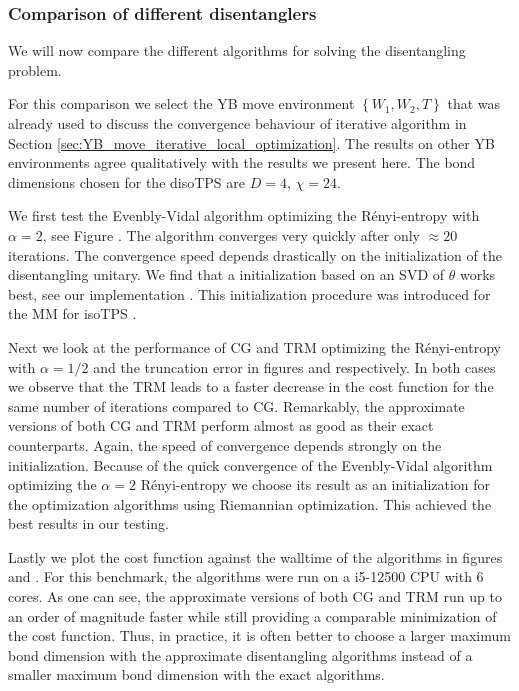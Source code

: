 \subsubsection*{\hspace{105pt}Comparison of different disentanglers}
We will now compare the different algorithms for solving the disentangling problem.


For this comparison we select the YB move environment $\left\{W_1, W_2, T\right\}$ that was already used to discuss the convergence behaviour of iterative algorithm in Section \ref{sec:YB_move_iterative_local_optimization}. The results on other YB environments agree qualitatively with the results we present here. The bond dimensions chosen for the disoTPS are $D = 4$, $\chi = 24$. \par
We first test the Evenbly-Vidal algorithm optimizing the Rényi-entropy with $\alpha = 2$, see Figure . The algorithm converges very quickly after only $\approx 20$ iterations. The convergence speed depends drastically on the initialization of the disentangling unitary. We find that a initialization based on an SVD of $\theta$ works best, see our implementation \cite{cite:github_disoTPS}. This initialization procedure was introduced for the MM for isoTPS \cite{cite:isometric_tensor_network_states_in_two_dimensions, cite:efficient_simulation_of_dynamics_in_two_dimensional_quantum_spin_systems}. \par
Next we look at the performance of CG and TRM optimizing the Rényi-entropy with $\alpha = 1/2$ and the truncation error in figures  and  respectively. In both cases we observe that the TRM leads to a faster decrease in the cost function for the same number of iterations compared to CG. Remarkably, the approximate versions of both CG and TRM perform almost as good as their exact counterparts. Again, the speed of convergence depends strongly on the initialization. Because of the quick convergence of the Evenbly-Vidal algorithm optimizing the $\alpha = 2$ Rényi-entropy we choose its result as an initialization for the optimization algorithms using Riemannian optimization. This achieved the best results in our testing. \par
Lastly we plot the cost function against the walltime of the algorithms in figures  and . For this benchmark, the algorithms were run on a i5-12500 CPU with 6 cores. As one can see, the approximate versions of both CG and TRM run up to an order of magnitude faster while still providing a comparable minimization of the cost function. Thus, in practice, it is often better to choose a larger maximum bond dimension with the approximate disentangling algorithms instead of a smaller maximum bond dimension with the exact algorithms.
